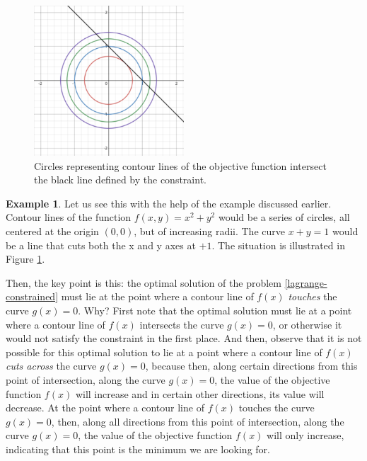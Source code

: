 \documentclass[a4paper]{article}
\theoremstyle{definition}
\newtheorem{example}{Example}[subsection]
\begin{document}
\begin{figure}
	\centering
	\label{lagrange-visualization}
	\includegraphics[width=0.5\textwidth]{figures/lagrange-visualization.png}
	\caption{Circles representing contour lines of the objective function intersect the black line defined by the constraint.}
\end{figure}

\begin{example}
	Let us see this with the help of the example discussed earlier.
	Contour lines of the function $f(x, y) = x^2 + y^2$ would be a series of circles, all centered at the origin $(0, 0)$, but of increasing radii.
	The curve $x + y = 1$ would be a line that cuts both the x and y axes at $+1$.
	The situation is illustrated in Figure \ref{lagrange-visualization}.
\end{example}

Then, the key point is this: the optimal solution of the problem \eqref{lagrange-constrained} must lie at the point where a contour line of $f(x)$ \textit{touches} the curve $g(x) = 0$.
Why?
First note that the optimal solution must lie at a point where a contour line of $f(x)$ intersects the curve $g(x) = 0$, or otherwise it would not satisfy the constraint in the first place.
And then, observe that it is not possible for this optimal solution to lie at a point where a contour line of $f(x)$ \textit{cuts across} the curve $g(x) = 0$, because then, along certain directions from this point of intersection, along the curve $g(x) = 0$, the value of the objective function $f(x)$ will increase and in certain other directions, its value will decrease.
At the point where a contour line of $f(x)$ touches the curve $g(x) = 0$, then, along all directions from this point of intersection, along the curve $g(x) = 0$, the value of the objective function $f(x)$ will only increase, indicating that this point is the minimum we are looking for.
\end{document}
